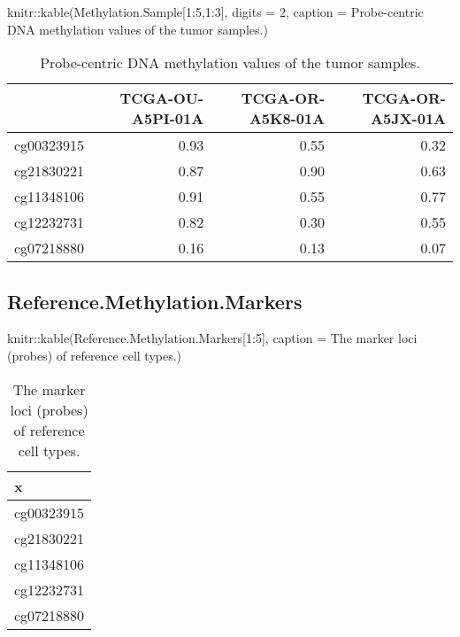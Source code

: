 \documentclass[]{article}
\newcommand{\hlnum}[1]{\textcolor[rgb]{0.816,0.125,0.439}{#1}}%
\newcommand{\hlstr}[1]{\textcolor[rgb]{0.251,0.627,0.251}{#1}}%
\newcommand{\hlstd}[1]{\textcolor[rgb]{0.251,0.251,0.251}{#1}}%
\newenvironment{Shaded}{\begin{myshaded}}{\end{myshaded}}
\newcommand{\DecValTok}[1]{\hlnum{#1}}
\newcommand{\SpecialCharTok}[1]{\hlstr{#1}}
\newcommand{\StringTok}[1]{\hlstr{#1}}
\newcommand{\FunctionTok}[1]{\hlstd{#1}}
\newcommand{\AttributeTok}[1]{{#1}}
\newcommand{\NormalTok}[1]{\hlstd{#1}}
\begin{document}
\begin{Shaded}
\begin{Highlighting}[]
\NormalTok{knitr}\SpecialCharTok{::}\FunctionTok{kable}\NormalTok{(Methylation.Sample[}\DecValTok{1}\SpecialCharTok{:}\DecValTok{5}\NormalTok{,}\DecValTok{1}\SpecialCharTok{:}\DecValTok{3}\NormalTok{], }\AttributeTok{digits =} \DecValTok{2}\NormalTok{, }\AttributeTok{caption =} \StringTok{\textquotesingle{}Probe{-}centric DNA methylation values of the tumor samples.\textquotesingle{}}\NormalTok{)}
\end{Highlighting}
\end{Shaded}

\begin{table}

\caption{\label{tab:unnamed-chunk-58}Probe-centric DNA methylation values of the tumor samples.}
\centering
\begin{tabular}[t]{l|r|r|r}
\hline
  & TCGA-OU-A5PI-01A & TCGA-OR-A5K8-01A & TCGA-OR-A5JX-01A\\
\hline
cg00323915 & 0.93 & 0.55 & 0.32\\
\hline
cg21830221 & 0.87 & 0.90 & 0.63\\
\hline
cg11348106 & 0.91 & 0.55 & 0.77\\
\hline
cg12232731 & 0.82 & 0.30 & 0.55\\
\hline
cg07218880 & 0.16 & 0.13 & 0.07\\
\hline
\end{tabular}
\end{table}

\hypertarget{reference.methylation.markers}{%
\subsection{\texorpdfstring{ Reference.Methylation.Markers}{  Reference.Methylation.Markers}}\label{reference.methylation.markers}}

\begin{Shaded}
\begin{Highlighting}[]
\NormalTok{knitr}\SpecialCharTok{::}\FunctionTok{kable}\NormalTok{(Reference.Methylation.Markers[}\DecValTok{1}\SpecialCharTok{:}\DecValTok{5}\NormalTok{], }\AttributeTok{caption =} \StringTok{\textquotesingle{}The marker loci (probes) of reference cell types.\textquotesingle{}}\NormalTok{)}
\end{Highlighting}
\end{Shaded}

\begin{table}

\caption{\label{tab:unnamed-chunk-59}The marker loci (probes) of reference cell types.}
\centering
\begin{tabular}[t]{l}
\hline
x\\
\hline
cg00323915\\
\hline
cg21830221\\
\hline
cg11348106\\
\hline
cg12232731\\
\hline
cg07218880\\
\hline
\end{tabular}
\end{table}
\end{document}
